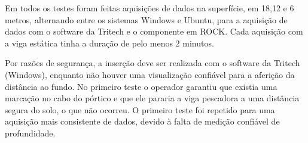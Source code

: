 Em todos os testes foram feitas aquisições de dados na superfície, em 18,12 e 6
metros, alternando entre os sistemas Windows e Ubuntu, para a aquisição de dados com o
software da Tritech e o componente em ROCK. Cada aquisição com a viga estática
tinha a duração de pelo menos 2 minutos.

Por razões de segurança, a inserção deve ser realizada com o
software da Tritech (Windows), enquanto não houver uma visualização confiável para a aferição da distância ao fundo. No primeiro teste o operador garantiu que
existia uma marcação no cabo do pórtico e que ele pararia a viga pescadora a uma
distância segura do solo, o que não ocorreu. O primeiro teste foi repetido para
uma aquisição mais consistente de dados, devido à falta de medição confiável de
profundidade.


 

\label{metodos}


